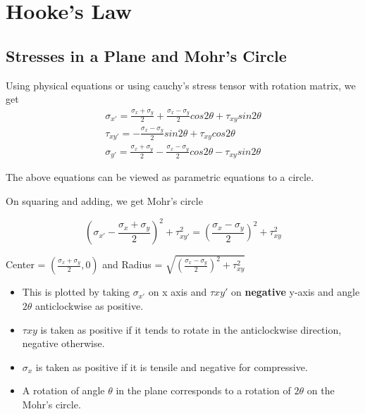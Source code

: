 \documentclass{article}
\begin{document}
\section{Hooke's Law}

	\subsection{Stresses in a Plane and Mohr's Circle}
	Using physical equations or using cauchy's stress tensor with rotation matrix, we get
	\begin{gather}
		\sigma_{x'} = \frac{\sigma_x + \sigma_y}{2} + \frac{\sigma_x - \sigma_y}{2} cos2\theta + \tau_{xy} sin2\theta \\
		\tau_{xy'} = -\frac{\sigma_x - \sigma_y}{2} sin2\theta + \tau_{xy} cos2\theta \\
		\sigma_{y'} = \frac{\sigma_x + \sigma_y}{2} - \frac{\sigma_x - \sigma_y}{2} cos2\theta - \tau_{xy} sin2\theta
	\end{gather}

	The above equations can be viewed as parametric equations to a circle.

	On squaring and adding, we get Mohr's circle

	\[\left(\sigma_{x'} -\frac{\sigma_x+\sigma_y}{2} \right)^2 + \tau_{xy'}^2 = \left(\frac{\sigma_x - \sigma_y}{2}\right)^2 + \tau_{xy}^2 \] 

	Center = $(\frac{\sigma_x+\sigma_y}{2},0)$ and 
	Radius = $\sqrt{\left(\frac{\sigma_x - \sigma_y}{2}\right)^2 + \tau_{xy}^2}$\\

	\begin{itemize}
		\item This is plotted by taking $\sigma_{x'}$ on x axis and $\tau{xy'}$ on \textbf{negative} y-axis and angle $2\theta$ anticlockwise as positive.\\
		\item $\tau{xy}$ is taken as positive if it tends to rotate in the anticlockwise direction, negative otherwise.
		\item $\sigma_x$ is taken as positive if it is tensile and negative for compressive.
		\item A rotation of angle $\theta$ in the plane corresponds to a rotation of $2\theta$ on the Mohr's circle.
	\end{itemize}
\end{document}
